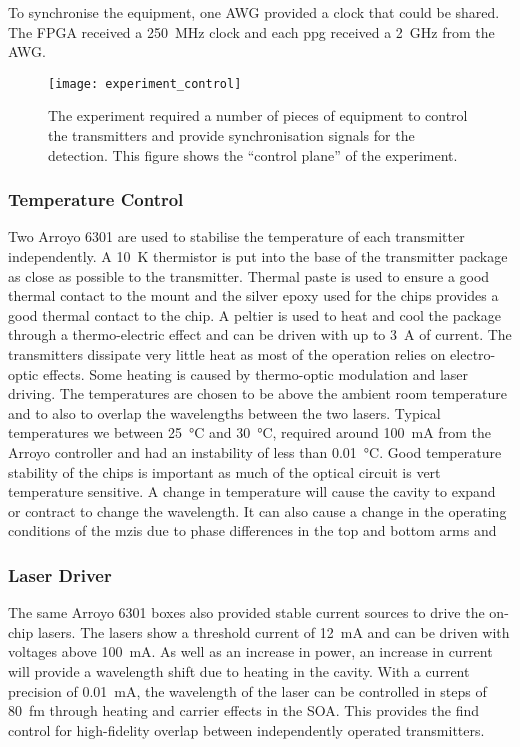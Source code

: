 To synchronise the equipment, one AWG provided a clock that could be shared. The FPGA received a \SI{250}{\MHz} clock and each \ac{ppg} received a \SI{2}{\GHz} from the AWG. 

\begin{figure}[tbp]
	\centering
	\texttt{[image: experiment\_control]}
	\caption[Control electronic schematic of the MDI-QKD experiment]{The experiment required a number of pieces of equipment to control the transmitters and provide synchronisation signals for the detection. This figure shows the ``control plane'' of the experiment.}
	\label{fig04:exp_control}
\end{figure}

\subsubsection*{Temperature Control}

Two Arroyo 6301 are used to stabilise the temperature of each transmitter independently. A \SI{10}{K} thermistor is put into the base of the transmitter package as close as possible to the transmitter. Thermal paste is used to ensure a good thermal contact to the mount and the silver epoxy used for the chips provides a good thermal contact to the chip. A peltier is used to heat and cool the package through a thermo-electric effect and can be driven with up to \SI{3}{A} of current. The transmitters dissipate very little heat as most of the operation relies on electro-optic effects. Some heating is caused by thermo-optic modulation and laser driving. The temperatures are chosen to be above the ambient room temperature and to also to overlap the wavelengths between the two lasers. Typical temperatures we between \SI{25}{\celsius} and \SI{30}{\celsius}, required around \SI{100}{mA} from the Arroyo controller and had an instability of less than \SI{0.01}{\celsius}. Good temperature stability of the chips is important as much of the optical circuit is vert temperature sensitive. A change in temperature will cause the cavity to expand or contract to change the wavelength. It can also cause a change in the operating conditions of the \acp{mzi} due to phase differences in the top and bottom arms and  

\subsubsection*{Laser Driver}

The same Arroyo 6301 boxes also provided stable current sources to drive the on-chip lasers. The lasers show a threshold current of \SI{12}{mA} and can be driven with voltages above \SI{100}{mA}. As well as an increase in power, an increase in current will provide a wavelength shift due to heating in the cavity. With a current precision of \SI{0.01}{mA}, the wavelength of the laser can be controlled in steps of \SI{80}{fm} through heating and carrier effects in the \ac{SOA}. This provides the find control for high-fidelity overlap between independently operated transmitters. 


